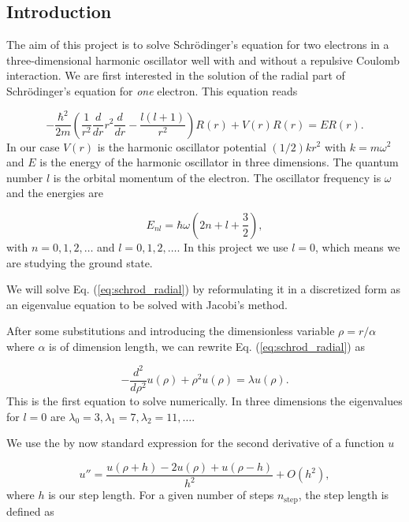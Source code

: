 \documentclass{article}
\begin{document}
\begin{multicols}{2}

\section{Introduction}
The aim of this project is to solve Schr\"odinger's equation for two electrons in a three-dimensional harmonic oscillator well with and without a repulsive Coulomb interaction. We are first interested in the solution of the radial part of Schr\"odinger's equation for \textit{one} electron. This equation reads

\begin{equation*}\label{eq:schrod_radial}
	-\frac{\hbar^2}{2 m} \left ( \frac{1}{r^2} \frac{d}{dr} r^2 \frac{d}{dr} - \frac{l (l + 1)}{r^2} \right )R(r) + V(r) R(r) = E R(r).
\end{equation*}
In our case $V(r)$ is the harmonic oscillator potential $(1/2)kr^2$ with $k=m\omega^2$ and $E$ is the energy of the harmonic oscillator in three dimensions. The quantum number $l$ is the orbital momentum of the electron. The oscillator frequency is $\omega$ and the energies are

\begin{equation*}
	E_{nl}=  \hbar \omega \left(2n+l+\frac{3}{2}\right),
\end{equation*}
with $n=0,1,2,\dots$ and $l=0,1,2,\dots$. In this project we use $l = 0$, which means we are studying the ground state. 

We will solve Eq. (\ref{eq:schrod_radial}) by reformulating it in a discretized form as an eigenvalue equation to be solved with Jacobi's method. 

After some substitutions and introducing the dimensionless variable $\rho = r/ \alpha$ where $\alpha$ is of dimension length, we can rewrite Eq. (\ref{eq:schrod_radial}) as

\begin{equation*}
	-\frac{d^2}{d\rho^2} u(\rho) + \rho^2u(\rho)  = \lambda u(\rho) .
\end{equation*}
This is the first equation to solve numerically. In three dimensions the eigenvalues for $l=0$ are $\lambda_0=3,\lambda_1=7,\lambda_2=11,\dots .$

We use the by now standard expression for the second derivative of a function $u$

\begin{equation*}\label{eq:diffoperation}
    u''=\frac{u(\rho+h) -2u(\rho) +u(\rho-h)}{h^2} +O(h^2),
\end{equation*} 
where $h$ is our step length. For a given number of steps $n_{\mathrm{step}}$, the step length is defined as


\end{multicols}
\end{document}
